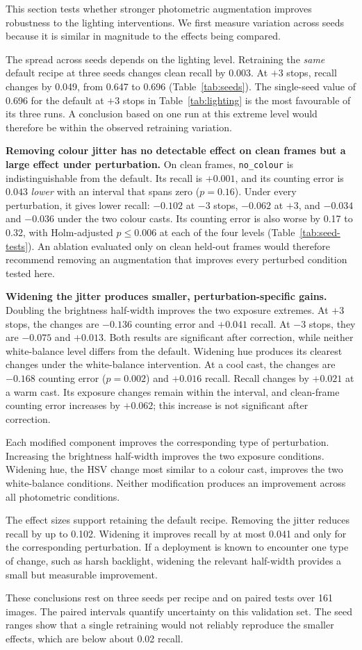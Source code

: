 This section tests whether stronger photometric augmentation improves robustness
to the lighting interventions. We first measure variation across seeds because
it is similar in magnitude to the effects being compared.

The spread across seeds depends on the lighting level. Retraining the
\emph{same} default recipe at three seeds changes clean recall by 0.003. At
$+3$ stops, recall changes by 0.049, from 0.647 to 0.696
(Table~\ref{tab:seeds}). The single-seed value of 0.696 for the default at $+3$
stops in Table~\ref{tab:lighting} is the most favourable of its three runs. A
conclusion based on one run at this extreme level would therefore be within the
observed retraining variation.

\textbf{Removing colour jitter has no detectable effect on clean frames but a
large effect under perturbation.} On clean frames, \texttt{no\_colour} is
indistinguishable from the default. Its recall is $+0.001$, and its counting
error is $0.043$ \emph{lower} with an interval that spans zero ($p=0.16$).
Under every perturbation, it gives lower recall: $-0.102$ at $-3$ stops,
$-0.062$ at $+3$, and $-0.034$ and $-0.036$ under the two colour casts. Its
counting error is also worse by 0.17 to 0.32, with Holm-adjusted $p \le 0.006$
at each of the four levels (Table~\ref{tab:seed-tests}). An ablation evaluated
only on clean held-out frames would therefore recommend removing an
augmentation that improves every perturbed condition tested here.

\textbf{Widening the jitter produces smaller, perturbation-specific gains.}
Doubling the brightness half-width improves the two exposure extremes. At $+3$
stops, the changes are $-0.136$ counting error and $+0.041$ recall. At $-3$
stops, they are $-0.075$ and $+0.013$. Both results are significant after
correction, while neither white-balance level differs from the default.
Widening hue produces its clearest changes under the white-balance intervention.
At a cool cast, the changes are $-0.168$ counting error ($p=0.002$) and $+0.016$
recall. Recall changes by $+0.021$ at a warm cast. Its exposure changes remain
within the interval, and clean-frame counting error increases by $+0.062$; this
increase is not significant after correction.

Each modified component improves the corresponding type of perturbation.
Increasing the brightness half-width improves the two exposure conditions.
Widening hue, the HSV change most similar to a colour cast, improves the two
white-balance conditions. Neither modification produces an improvement across
all photometric conditions.

The effect sizes support retaining the default recipe. Removing the jitter
reduces recall by up to 0.102. Widening it improves recall by at most 0.041 and
only for the corresponding perturbation. If a deployment is known to encounter
one type of change, such as harsh backlight, widening the relevant half-width
provides a small but measurable improvement.

These conclusions rest on three seeds per recipe and on paired tests over 161
images. The paired intervals quantify uncertainty on this validation set. The
seed ranges show that a single retraining would not reliably reproduce the
smaller effects, which are below about 0.02 recall.
